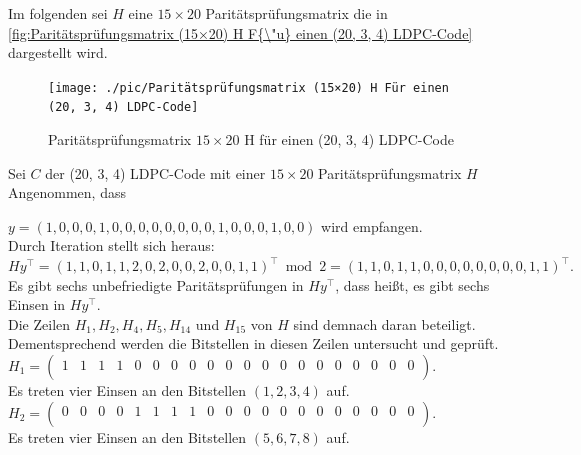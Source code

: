     Im folgenden sei $H$ eine $15 \times 20$ Paritätspr{\"u}fungsmatrix die in  \autoref{fig:Paritätsprüfungsmatrix (15×20) H F{\"u} einen (20, 3, 4) LDPC-Code} dargestellt wird.
    
    \begin{figure}[!ht]
        \centering
         {\texttt{[image: ./pic/Paritätsprüfungsmatrix (15×20) H Für einen (20, 3, 4) LDPC-Code]}}
        \caption{ Paritätspr{\"u}fungsmatrix  \(15\times20\) H für einen (20, 3, 4) LDPC-Code}
        \label{fig:Paritätsprüfungsmatrix (15×20) H F{\"u} einen (20, 3, 4) LDPC-Code}
    \end{figure} 
    

\begin{Beispiel}
    Sei $C$ der (20, 3, 4) LDPC-Code mit einer $15 \times 20$ Paritätspr{\"u}fungsmatrix $H$\\
    Angenommen, dass
    
    $y = (1,0,0,0,1,0,0,0,0,0,0,0,0,1,0,0,0,1,0,0)$ wird empfangen.\\
    
    Durch Iteration stellt sich heraus:\\
    $Hy^\intercal= (1,1,0,1,1,2,0,2,0,0,2,0,0,1,1)^\intercal \bmod 2= (1,1,0,1,1,0,0,0,0,0,0,0,0,1,1)^\intercal.$\\
    
    
    Es gibt sechs unbefriedigte Paritätsprüfungen in $Hy^\intercal$,
    dass hei\ss{}t, es gibt sechs Einsen in $Hy^\intercal.$\\
    Die Zeilen $H_1, H_2, H_4, H_5, H_{14}$ und $H_{15}$ von $H$ sind demnach daran beteiligt.\\ 
    Dementsprechend werden die Bitstellen in diesen Zeilen untersucht und geprüft.\\
    
    $H_1= \left( \begin{array}{rrrrrrrrrrrrrrrrrrrr}
        1 & 1 & 1 & 1 & 0 & 0 & 0 & 0 & 0 & 0 & 0 & 0 & 0 & 0 & 0 & 0 & 0 & 0 & 0 & 0 \\
       \end{array}\right). 
    $\\
    Es treten vier Einsen an den Bitstellen $(1, 2, 3, 4)$ auf.\\
    
    $H_2= \left( \begin{array}{rrrrrrrrrrrrrrrrrrrr}
        0 & 0 & 0 & 0 & 1 & 1 & 1 & 1 & 0 & 0 & 0 & 0 & 0 & 0 & 0 & 0 & 0 & 0 & 0 & 0 \\
       \end{array}\right). 
    $\\
    Es treten vier Einsen an den Bitstellen $(5, 6, 7, 8)$ auf.\\
    

\end{Beispiel}
